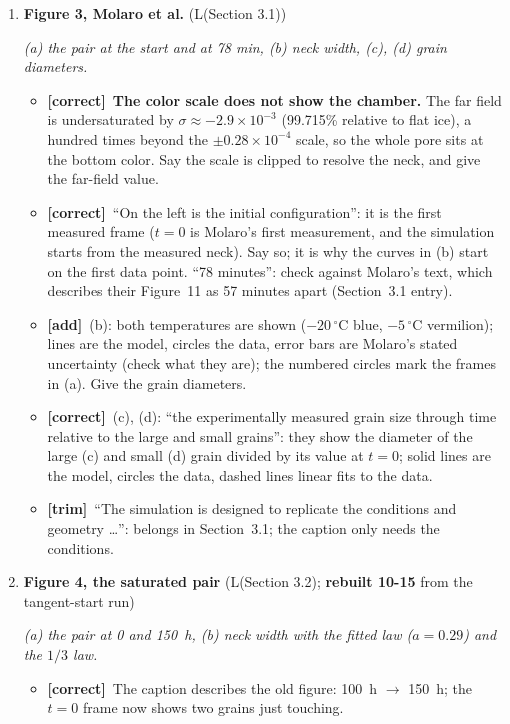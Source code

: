 \documentclass[11pt]{article}
\newcommand{\Pg}[3]{\item \textbf{#1} {\small(#2)}\par\textit{#3}}
\newcommand{\tC}{\textcolor{miss}{\textbf{[correct]}}\ }
\newcommand{\tG}{\textcolor{stale}{\textbf{[wording]}}\ }
\newcommand{\tT}{\textcolor{cut}{\textbf{[trim]}}\ }
\newcommand{\tA}{\textcolor{have}{\textbf{[add]}}\ }
\begin{document}
\begin{enumerate}
\begin{itemize}
    ``brighter paths carry more heat''.
  \item \tG ``the mesh in which we solve our homogenization model over'':
    ``the mesh on which the cell problem is solved''.
  \end{itemize}
\Pg{Figure 3, Molaro et al.}{L(Section 3.1)}{(a) the pair at the start and at 78 min, (b) neck width, (c), (d) grain diameters.}
  \begin{itemize}
  \item \tC \textbf{The color scale does not show the chamber.} The far
    field is undersaturated by $\sigma \approx -2.9\times10^{-3}$ (99.715\%
    relative to flat ice), a hundred times beyond the $\pm0.28\times10^{-4}$
    scale, so the whole pore sits at the bottom color. Say the scale is
    clipped to resolve the neck, and give the far-field value.
  \item \tC ``On the left is the initial configuration'': it is the first
    measured frame ($t = 0$ is Molaro's first measurement, and the
    simulation starts from the measured neck). Say so; it is why the curves
    in (b) start on the first data point. ``78 minutes'': check against
    Molaro's text, which describes their Figure~11 as 57 minutes apart
    (Section~3.1 entry).
  \item \tA (b): both temperatures are shown ($-20\,^{\circ}$C blue,
    $-5\,^{\circ}$C vermilion); lines are the model, circles the data, error
    bars are Molaro's stated uncertainty (check what they are); the numbered
    circles mark the frames in (a). Give the grain diameters.
  \item \tC (c), (d): ``the experimentally measured grain size through time
    relative to the large and small grains'': they show the diameter of the
    large (c) and small (d) grain divided by its value at $t = 0$; solid
    lines are the model, circles the data, dashed lines linear fits to the
    data.
  \item \tT ``The simulation is designed to replicate the conditions and
    geometry \ldots'': belongs in Section~3.1; the caption only needs the
    conditions.
  \end{itemize}
\Pg{Figure 4, the saturated pair}{L(Section 3.2); \textbf{rebuilt 10-15} from the tangent-start run}{(a) the pair at 0 and 150~h, (b) neck width with the fitted law ($a = 0.29$) and the $1/3$ law.}
  \begin{itemize}
  \item \tC The caption describes the old figure: 100~h $\to$ 150~h; the
    $t = 0$ frame now shows two grains just touching.

\end{itemize}
\end{enumerate}
\end{document}
